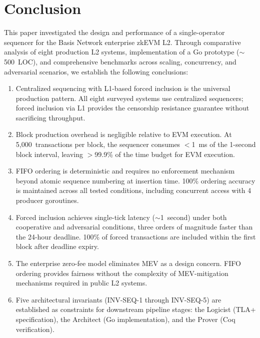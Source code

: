 
\section{Conclusion}

This paper investigated the design and performance of a single-operator sequencer for
the Basis Network enterprise zkEVM L2. Through comparative analysis of eight production
L2 systems, implementation of a Go prototype (${\sim}$500~LOC), and comprehensive
benchmarks across scaling, concurrency, and adversarial scenarios, we establish the
following conclusions:

\begin{enumerate}
  \item Centralized sequencing with L1-based forced inclusion is the universal
    production pattern. All eight surveyed systems use centralized sequencers; forced
    inclusion via L1 provides the censorship resistance guarantee without sacrificing
    throughput.

  \item Block production overhead is negligible relative to EVM execution. At
    5{,}000~transactions per block, the sequencer consumes $<$1~ms of the 1-second
    block interval, leaving $>$99.9\% of the time budget for EVM execution.

  \item FIFO ordering is deterministic and requires no enforcement mechanism beyond
    atomic sequence numbering at insertion time. 100\% ordering accuracy is maintained
    across all tested conditions, including concurrent access with 4 producer
    goroutines.

  \item Forced inclusion achieves single-tick latency (${\sim}$1~second) under both
    cooperative and adversarial conditions, three orders of magnitude faster than the
    24-hour deadline. 100\% of forced transactions are included within the first block
    after deadline expiry.

  \item The enterprise zero-fee model eliminates MEV as a design concern. FIFO
    ordering provides fairness without the complexity of MEV-mitigation mechanisms
    required in public L2 systems.

  \item Five architectural invariants (INV-SEQ-1 through INV-SEQ-5) are established
    as constraints for downstream pipeline stages: the Logicist (TLA+ specification),
    the Architect (Go implementation), and the Prover (Coq verification).
\end{enumerate}

